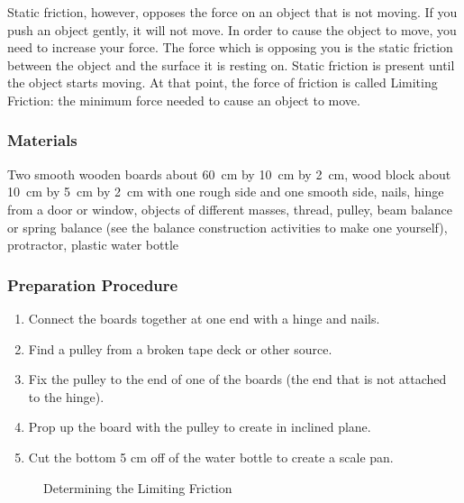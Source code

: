 Static friction, however, opposes the force on an object that is not moving. If you push an object gently, it will not move. In order to cause the object to move, you need to increase your force. The force which is opposing you is the static friction between the object and the surface it is resting on. Static friction is present until the object starts moving. At that point, the force of friction is called Limiting Friction: the minimum force needed to cause an object to move.  

\subsubsection*{Materials}
Two smooth wooden boards about 60~cm by 10~cm by 2~cm, wood block about 10~cm by 5~cm by 2~cm with one rough side and one smooth side, nails, hinge from a door or window, objects of different masses, thread, pulley, beam balance or spring balance (see the balance construction activities to make one yourself), protractor, plastic water bottle

\subsubsection*{Preparation Procedure}
\begin{enumerate}
\item{Connect the boards together at one end with a hinge and nails.} 
\item{Find a pulley from a broken tape deck or other source.} 
\item{Fix the pulley to the end of one of the boards (the end that is not attached to the hinge).} 
\item{Prop up the board with the pulley to create in inclined plane.} 
\item{Cut the bottom 5 cm off of the water bottle to create a scale pan.} 
\end{enumerate}

\begin{figure}[h]
\begin{center}
\def\svgwidth{150pt}

\caption{Determining the Limiting Friction}
\label{fig:limiting-friction}
\end{center}
\end{figure}

